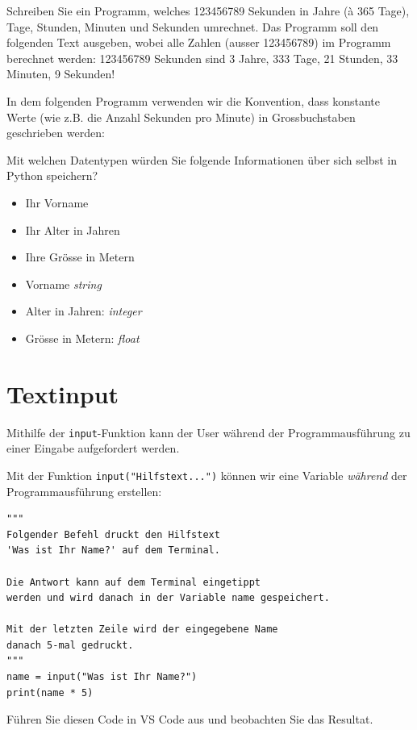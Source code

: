 \begin{mychallenge}\label{ex:sToY}
	Schreiben Sie ein Programm, welches 123456789 Sekunden in Jahre (à 365 Tage), Tage, Stunden, Minuten und Sekunden umrechnet.
	Das Programm soll den folgenden Text ausgeben, wobei alle Zahlen (ausser 123456789) im Programm berechnet werden: 123456789 Sekunden sind 3 Jahre, 333 Tage, 21 Stunden, 33 Minuten, 9 Sekunden!
	\begin{myanswer}
		In dem folgenden Programm verwenden wir die Konvention, dass konstante Werte (wie z.B. die Anzahl Sekunden pro Minute) in Grossbuchstaben geschrieben werden:
		
	\end{myanswer}
\end{mychallenge}

\begin{myexercise}\label{ex:datatypes}
	Mit welchen Datentypen würden Sie folgende Informationen über sich selbst in Python speichern?
	\begin{itemize}
		\item Ihr Vorname
		\item Ihr Alter in Jahren
		\item Ihre Grösse in Metern
	\end{itemize}
	\begin{myanswer}
		\begin{itemize}
			\item Vorname \emph{string}
			\item Alter in Jahren: \emph{integer}
			\item Grösse in Metern: \emph{float}
		\end{itemize}
	\end{myanswer}
\end{myexercise}

\section{Textinput}
Mithilfe der \lstinline{input}-Funktion kann der User während der Programmausführung zu einer Eingabe aufgefordert werden.
\begin{myexample}\label{ex:input}
Mit der Funktion \lstinline|input("Hilfstext...")| können wir eine Variable \emph{während} der Programmausführung erstellen:

\begin{lstlisting}
"""
Folgender Befehl druckt den Hilfstext
'Was ist Ihr Name?' auf dem Terminal.

Die Antwort kann auf dem Terminal eingetippt
werden und wird danach in der Variable name gespeichert.

Mit der letzten Zeile wird der eingegebene Name
danach 5-mal gedruckt.
"""
name = input("Was ist Ihr Name?")
print(name * 5)
\end{lstlisting}

Führen Sie diesen Code in VS Code aus und beobachten Sie das Resultat.
\end{myexample}

